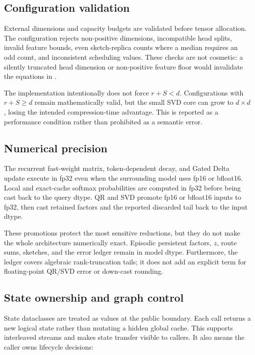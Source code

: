 \subsection{Configuration validation}

External dimensions and capacity budgets are validated before tensor
allocation. The configuration rejects non-positive dimensions, incompatible
head splits, invalid feature bounds, even sketch-replica counts where a median
requires an odd count, and inconsistent scheduling values. These checks are
not cosmetic: a silently truncated head dimension or non-positive feature
floor would invalidate the equations in .

The implementation intentionally does not force \(r+S<d\). Configurations
with \(r+S\ge d\) remain mathematically valid, but the small SVD core can grow
to \(d\times d\), losing the intended compression-time advantage. This is
reported as a performance condition rather than prohibited as a semantic
error.

\subsection{Numerical precision}

The recurrent fast-weight matrix, token-dependent decay, and Gated Delta
update execute in fp32 even when the surrounding model uses fp16 or bfloat16.
Local and exact-cache softmax probabilities are computed in fp32 before being
cast back to the query dtype. QR and SVD promote fp16 or bfloat16 inputs to
fp32, then cast retained factors and the reported discarded tail back to the
input dtype.

These promotions protect the most sensitive reductions, but they do not make
the whole architecture numerically exact. Episodic persistent factors,
\(z\), route sums, sketches, and the error ledger remain in model dtype.
Furthermore, the ledger covers algebraic rank-truncation tails; it does not
add an explicit term for floating-point QR/SVD error or down-cast rounding.

\subsection{State ownership and graph control}

State dataclasses are treated as values at the public boundary. Each call
returns a new logical state rather than mutating a hidden global cache. This
supports interleaved streams and makes state transfer visible to callers. It
also means the caller owns lifecycle decisions:

